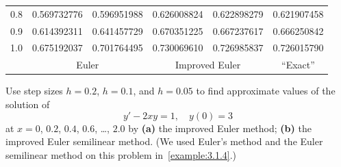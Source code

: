 \begin{examplesolution}
\begin{newtable}
\begin{center}
\begin{tabular}{|c|r|r|r|r|r|}
      0.8                       & 0.569732776                   & 0.596951988                         & 0.626008824                   & 0.622898279                    & 0.621907458                     \\
      0.9                       & 0.614392311                   & 0.641457729                         & 0.670351225                   & 0.667237617                    & 0.666250842                     \\
      1.0                       & 0.675192037                   & 0.701764495                         & 0.730069610                   & 0.726985837                    & 0.726015790                     \\
      \hline
                                & \multicolumn{2}{c|}{Euler}    & \multicolumn{2}{c|}{Improved Euler} & \multicolumn{1}{c|}{``Exact''} \\
      \hline
    \end{tabular}
  \end{center}
\end{newtable}
\end{examplesolution}

\begin{example}
  \label{example:3.2.4} \rm Use step sizes $h=0.2$, $h=0.1$, and $h=0.05$ to find approximate values
  of the solution of
  \begin{equation}
    \label{eq:3.2.6}y'-2xy=1,\quad y(0)=3
  \end{equation}
  at $x=0$, $0.2$, $0.4$, $0.6$, \dots, $2.0$ by {\bf (a)} the improved Euler method; {\bf (b)} the
  improved Euler semilinear method. (We used Euler's method and the Euler semilinear method on this
  problem in~\ref{example:3.1.4}.)
\end{example}

